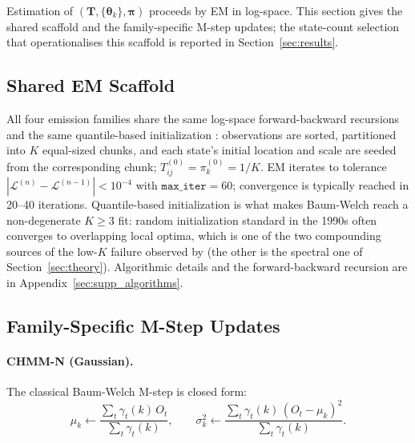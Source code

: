 Estimation of $(\mathbf{T}, \{\boldsymbol\theta_k\}, \boldsymbol\pi)$ proceeds by EM in log-space.
This section gives the shared scaffold and the family-specific M-step updates; the state-count selection that operationalises this scaffold is reported in Section~\ref{sec:results}.

\subsection{Shared EM Scaffold}
\label{sec:em_scaffold}

All four emission families share the same log-space forward-backward
recursions and the same quantile-based initialization \cite{bilmes1998gentle}:
observations are sorted, partitioned into $K$ equal-sized chunks, and each
state's initial location and scale are seeded from the corresponding chunk;
$T_{ij}^{(0)} = \pi_k^{(0)} = 1/K$.
EM iterates to tolerance $|\mathcal{L}^{(n)} - \mathcal{L}^{(n-1)}| < 10^{-4}$
with $\texttt{max\_iter} = 60$; convergence is typically reached in
20--40 iterations.
Quantile-based initialization is what makes Baum-Welch reach a non-degenerate $K \ge 3$ fit: random initialization standard in the 1990s often converges to overlapping local optima, which is one of the two compounding sources of the low-$K$ failure observed by \citet{ryden1998stylized} (the other is the spectral one of Section~\ref{sec:theory}).
Algorithmic details and the forward-backward recursion are in Appendix~\ref{sec:supp_algorithms}.

\subsection{Family-Specific M-Step Updates}
\label{sec:mstep}

\paragraph{CHMM-N (Gaussian).}
The classical Baum-Welch M-step \cite{baum1970maximization} is closed form:
\[
\mu_k \leftarrow \frac{\sum_t \gamma_t(k)\, O_t}{\sum_t \gamma_t(k)},
\qquad
\sigma_k^2 \leftarrow \frac{\sum_t \gamma_t(k)\, (O_t - \mu_k)^2}{\sum_t \gamma_t(k)}.
\]

